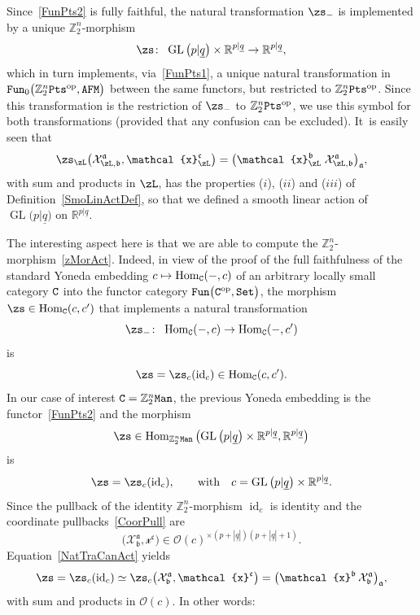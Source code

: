 \documentclass[pdftex]{sigma}%
\newcommand{\op}[1]{\operatorname{#1}}
\newcommand{\R}{{\mathbb R}}
\newcommand{\Z}{{\mathbb Z}}
\def\ul{\underline}
\def\cO{\mathcal{O}}
\def\ul{\underline}
\newcommand{\0}{\otimes}
\newcommand{\id}{\op{id}}
\newcommand{\z}{\Z_2^n}
\numberwithin{equation}{section}
\begin{document}
Since~\eqref{FunPts2} is fully faithful, the natural transformation $\zs_-$ is implemented by a unique $\z$-morphism
\begin{gather}\label{zMorAct}
\zs\colon\ \op{GL}\big(p|\ul q\big)\times\R^{p|\ul q}\to\R^{p|\ul q},
\end{gather}
which in turn implements, via~\eqref{FunPts1}, a unique natural transformation in ${\tt Fun}_0\big(\z{\tt Pts}^{\op{op}},{\tt AFM}\big)$ between the same functors, but restricted to $\z{\tt Pts}^{\op{op}}$. Since this transformation is the restriction of $\zs _-$ to $\z{\tt Pts}^{\op{op}}$, we use this symbol for both transformations (provided that any confusion can be excluded). It~is easily seen that
\[
\zs_\zL\big(\mathcal{X}^{\mathfrak{a}}_{\zL,\mathfrak{b}},\mathcal{x}_\zL^{\mathfrak{c}}\big) =\big(\mathcal{x}_\zL^{\mathfrak{b}}\;\mathcal{X}^{\mathfrak{a}}_{\zL,\mathfrak{b}}\big)_\mathfrak{a},
\]
with sum and products in $\zL$, has the properties ($i$), ($ii$) and ($iii$) of Definition~\ref{SmoLinActDef}, so that we defined a smooth linear action of $\op{GL}\big(p|\ul q\big)$ on $\R^{p|\ul q}$.

The interesting aspect here is that we are able to compute the $\z$-morphism~\eqref{zMorAct}. Indeed, in view of the proof of the full faithfulness of the standard Yoneda embedding $c\mapsto \op{Hom}_{\tt C}(-,c)$ of an arbitrary locally small category $\tt C$ into the functor category ${\tt Fun}\big({\tt C}^{\op{op}},{\tt Set}\big)$, the morphism $\zs\in\op{Hom}_{\tt C}(c,c')$ that implements a natural transformation
\[
\zs_-\colon\ \op{Hom}_{\tt C}(-,c)\to \op{Hom}_{\tt C}(-,c')
\]
is
\[
\zs=\zs_c(\id_c)\in\op{Hom}_{\tt C}(c,c').
\]
In our case of interest ${\tt C}=\z{\tt Man}$, the previous Yoneda embedding is the functor~\eqref{FunPts2} and the morphism
\[
\zs\in\op{Hom}_{\z\tt Man}\big(\!\op{GL}\big(p|\ul q\big)\times\R^{p|\ul q},\R^{p|\ul q}\big)
\]
is
\[
\zs=\zs_c(\id_c),\qquad\text{with}\quad c=\op{GL}\big(p|\ul q\big)\times\R^{p|\ul q}.
\]
Since the pullback of the identity $\z$-morphism $\id_c$ is identity and the coordinate pullbacks~\eqref{CoorPull} are
\[
\big(\mathcal{X}^{\mathfrak{a}}_{\mathfrak{b}},\mathcal{x}^{\mathfrak{c}}\big)\in\cO(c)^{\times(p+|\ul q|)(p+|\ul q|+1)}.
\]
Equation~\eqref{NatTraCanAct} yields
\[
\zs=\zs_c(\id_c)\simeq\zs_c\big(\mathcal{X}^{\mathfrak{a}}_{\mathfrak{b}},\mathcal{x}^{\mathfrak{c}}\big) =\big(\mathcal{x}^{\mathfrak{b}}\,\mathcal{X}^{\mathfrak{a}}_{\mathfrak{b}}\big)_{\mathfrak{a}},
\]
with sum and products in $\cO(c)$. In other words:
\end{document}
